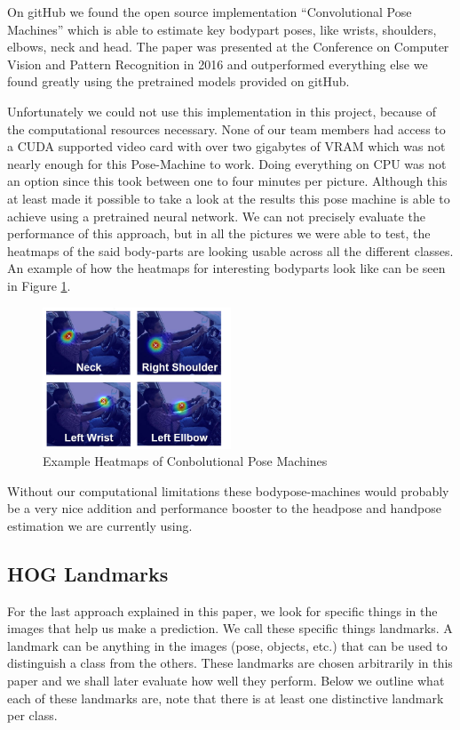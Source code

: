 \documentclass[10pt,twocolumn,letterpaper]{article}
\begin{document}
On gitHub we found the open source implementation ``Convolutional Pose Machines'' which is able to estimate key bodypart poses, like wrists, shoulders, elbows, neck and head.\cite{DBLP:journals/corr/WeiRKS16} The paper was presented at the Conference on Computer Vision and Pattern Recognition in 2016 and outperformed everything else we found greatly using the pretrained models provided on gitHub. 

Unfortunately we could not use this implementation in this project, because of the computational resources necessary. None of our team members had access to a CUDA supported video card with over two gigabytes of VRAM which was not nearly enough for this Pose-Machine to work. Doing everything on CPU was not an option since this took between one to four minutes per picture. Although this at least made it possible to take a look at the results this pose machine is able to achieve using a pretrained neural network. We can not precisely evaluate the performance of this approach, but in all the pictures we were able to test, the heatmaps of the said body-parts are looking usable across all the different classes. An example of how the heatmaps for interesting bodyparts look like can be seen in Figure \ref{BodyPoseExample}.\\
\begin{figure}[h]
    \centering
    \includegraphics[width=0.5\textwidth]{BodyPoseExample}
    \caption{Example Heatmaps of Conbolutional Pose Machines}
    \label{BodyPoseExample}
\end{figure}

Without our computational limitations these bodypose-machines would probably be a very nice addition and performance booster to the headpose and handpose estimation we are currently using.


\subsection{HOG Landmarks}

For the last approach explained in this paper, we look for specific things in the images that help us make a prediction. We call these specific things landmarks. A landmark can be anything in the images (pose, objects, etc.) that can be used to distinguish a class from the others. These landmarks are chosen arbitrarily in this paper and we shall later evaluate how well they perform. Below we outline what each of these landmarks are, note that there is at least one distinctive landmark per class.
\end{document}
